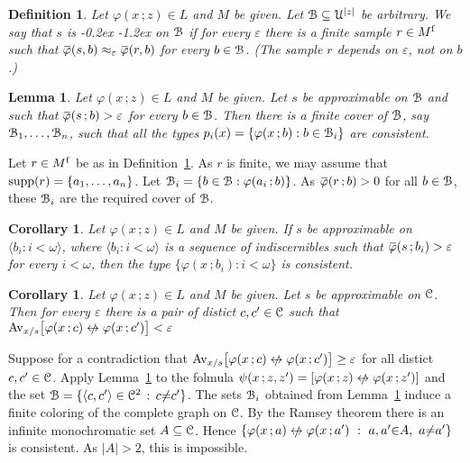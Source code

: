 \documentclass[10pt,openany]{article}
\def\supp{\mathop{\rm supp}}
\newcommand{\sbar}[1]{\mkern 1.8mu\overline{\mkern-1.8mu#1\mkern-1mu}\mkern 1mu}
\def\niff{\mathrel{{\leftrightarrow}\llap{\raisebox{-.1ex}{{\small$/$}}\hskip.5ex}}}
\def\C{\EuScript C}
\def\U{\EuScript U}
\def\B{\EuScript B}
\def\<{\langle}
\def\>{\rangle}
\def\phi{\varphi}
\def\epsilon{\varepsilon}
\newcounter{thm}[section]
\theoremstyle{mio}
\newtheorem{corollary}[thm]{Corollary}
\newtheorem{lemma}[thm]{Lemma}
\newtheorem{definition}[thm]{Definition}
\theoremstyle{liscio}
\def\QED{\noindent\nolinebreak[4]\hspace{\stretch{1}}\rlap{\ \ $\Box$}\medskip}
\renewenvironment{proof}[1][Proof]%
{\begin{trivlist}\item[\hskip\labelsep {\bf #1}]}
{\QED\end{trivlist}}
\renewcommand*{\emph}[1]{%
   \kern-0.2ex 
   \smash{\tikz[baseline]
   \node[ rectangle, fill=emphcolor, rounded corners, 
          inner xsep=.3ex, inner ysep=.2ex, anchor=base,
          minimum height = 3ex
         ]{#1};
   }
   \kern-1.2ex 
}
\begin{document}
\begin{definition}\label{def_approximable_sample}
  Let $\phi(x\,;z)\in L$ and $M$ be given.
  Let $\B\subseteq\U^{|z|}$ be arbitrary.
  We say that $s$ is \emph{(uniformly) approximable\/} on $\B$ if for every $\epsilon$ there is a finite sample $r\in M^{\rm f}$ such that $\sbar\phi(s,b)\approx_\epsilon\sbar\phi(r,b)$ for every $b\in\B$. (The sample $r$ depends on $\epsilon$, not on $b$.)\QED
\end{definition}

\begin{lemma}\label{lem_cons}
  Let $\phi(x\,;z)\in L$ and $M$ be given.
  Let $s$ be approximable on $\B$ and such that $\sbar\phi(s\,;b)>\epsilon$ for every $b\in\B$. Then there is a finite cover of $\B$, say $\B_1,\dots,\B_n$, such that all the types $p_i(x)=\{\phi(x\,;b):b\in\B_i\}$ are consistent.
\end{lemma}

\begin{proof}
  Let $r\in M^{\rm f}$ be as in Definition~\ref{def_approximable_sample}.
  As $r$ is finite, we may assume that $\supp(r)=\{a_1,\dots,a_n\}$.
  Let $\B_i=\{b\in\B:\phi(a_i\,;b)\}$.
  As $\sbar\phi(r\,;b)>0$ for all $b\in\B$, these $\B_i$ are the required cover of $\B$.
\end{proof}

\begin{corollary}
  Let $\phi(x\,;z)\in L$ and $M$ be given.
  If $s$ be approximable on $\<b_i:i<\omega\>$, where $\<b_i:i<\omega\>$ is a sequence of indiscernibles such that $\sbar\phi(s\,;b_i)>\epsilon$ for every $i<\omega$, then the type $\{\phi(x\,;b_i):i<\omega\}$ is consistent.\QED
\end{corollary}

\begin{corollary}
  Let $\phi(x\,;z)\in L$ and $M$ be given.
  Let $s$ be approximable on $\C$.
  Then for every $\epsilon$ there is a pair of distict $c,c'\in\C$ such that $\Av_{x/s}\big[\phi(x\,;c)\niff\phi(x\,;c')\big]<\epsilon$
\end{corollary}

\begin{proof}
  Suppose for a contradiction that $\Av_{x/s}\big[\phi(x\,;c)\niff\phi(x\,;c')\big]\ge\epsilon$ for all distict $c,c'\in\C$. Apply Lemma~\ref{lem_cons} to the folmula $\psi(x\,;z,z') = [\phi(x\,;z)\niff\phi(x\,;z')]$ and the set $\B=\{\<c,c'\>\in\C^2\, :\, c{\neq} c'\}$.
 The sets $\B_i$ obtained from Lemma~\ref{lem_cons} induce a finite coloring of the complete graph on $\C$.
 By the Ramsey theorem there is an infinite monochromatic set $A\subseteq\C$.
 Hence $\{\phi(x\,;a)\niff\phi(x\,;a')\  :\  a,a'{\in} A,\ a{\neq} a'\}$ is consistent.
 As $|A|>2$, this is impossible.
\end{proof}
\end{document}
